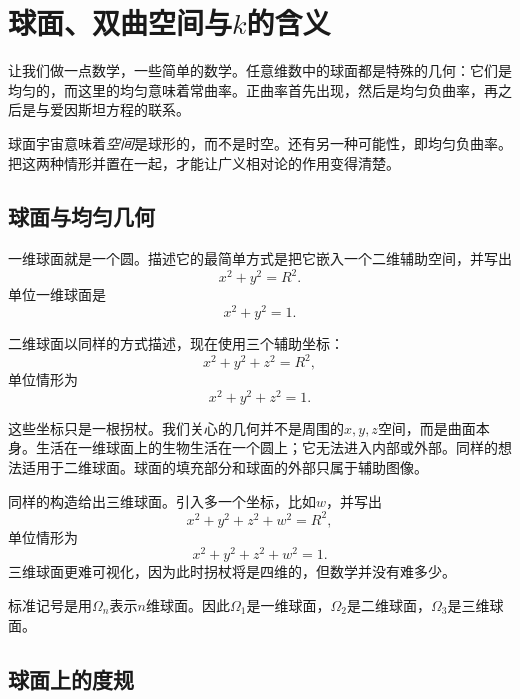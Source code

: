 \chapter{球面、双曲空间与\(k\)的含义}

让我们做一点数学，一些简单的数学。任意维数中的球面都是特殊的几何：它们是均匀的，而这里的均匀意味着常曲率。正曲率首先出现，然后是均匀负曲率，再之后是与爱因斯坦方程的联系。

球面宇宙意味着\emph{空间}是球形的，而不是时空。还有另一种可能性，即均匀负曲率。把这两种情形并置在一起，才能让广义相对论的作用变得清楚。

\section{球面与均匀几何}

一维球面就是一个圆。描述它的最简单方式是把它嵌入一个二维辅助空间，并写出
\begin{equation}
x^2+y^2=R^2.
\end{equation}
单位一维球面是
\begin{equation}
x^2+y^2=1.
\end{equation}

二维球面以同样的方式描述，现在使用三个辅助坐标：
\begin{equation}
x^2+y^2+z^2=R^2,
\end{equation}
单位情形为
\begin{equation}
x^2+y^2+z^2=1.
\end{equation}

这些坐标只是一根拐杖。我们关心的几何并不是周围的\(x,y,z\)空间，而是曲面本身。生活在一维球面上的生物生活在一个圆上；它无法进入内部或外部。同样的想法适用于二维球面。球面的填充部分和球面的外部只属于辅助图像。

同样的构造给出三维球面。引入多一个坐标，比如\(w\)，并写出
\begin{equation}
x^2+y^2+z^2+w^2=R^2,
\end{equation}
单位情形为
\begin{equation}
x^2+y^2+z^2+w^2=1.
\end{equation}
三维球面更难可视化，因为此时拐杖将是四维的，但数学并没有难多少。

标准记号是用\(\Omega_n\)表示\(n\)维球面。因此\(\Omega_1\)是一维球面，\(\Omega_2\)是二维球面，\(\Omega_3\)是三维球面。

\section{球面上的度规}

